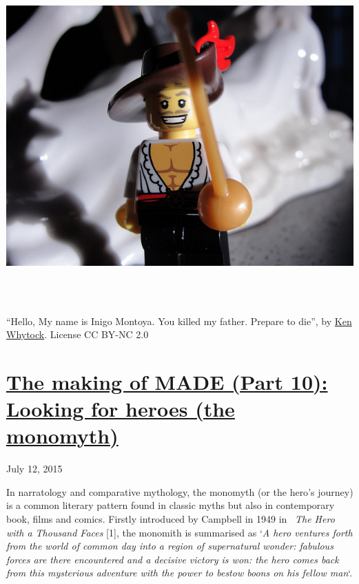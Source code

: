 \documentclass[a4paper]{article}
\newcommand\textstyleEmphasis[1]{\textit{#1}}
\begin{document}
\href{http://www.velonuboso.com/made/blog/wp-content/uploads/2015/07/16759361881_47ec9b0302_z.jpg}{
\includegraphics[width=16.986cm,height=12.753cm]{makingofmade113-img13.jpg}
}

{\textquotedblleft}Hello, My name is Inigo Montoya. You killed my
father. Prepare to die{\textquotedblright}, by
\href{https://www.flickr.com/photos/7815007@N07/}{Ken Whytock}. License
CC BY-NC 2.0
\clearpage\section[The making of MADE (Part 10): Looking for heroes (the
monomyth)]{\href{http://www.velonuboso.com/made/2015/07/12/making-part-10-heroes-the-problem/}{The
making of MADE (Part 10): Looking for heroes (the monomyth)}}
July 12, 2015

In narratology and comparative mythology, the monomyth (or the
hero{\textquoteright}s journey) is a common literary pattern found in
classic myths but also in contemporary book, films and comics. Firstly
introduced by Campbell in 1949 in~ \textit{The Hero with a Thousand
Faces} [1], the monomith is summarised as
{\textquoteleft}\textstyleEmphasis{A hero ventures forth from the world
of common day into a region of supernatural wonder: fabulous forces are
there encountered and a decisive victory is won: the hero comes back
from this mysterious adventure with the power to bestow boons on his
fellow man}{\textquoteleft}.
\end{document}
